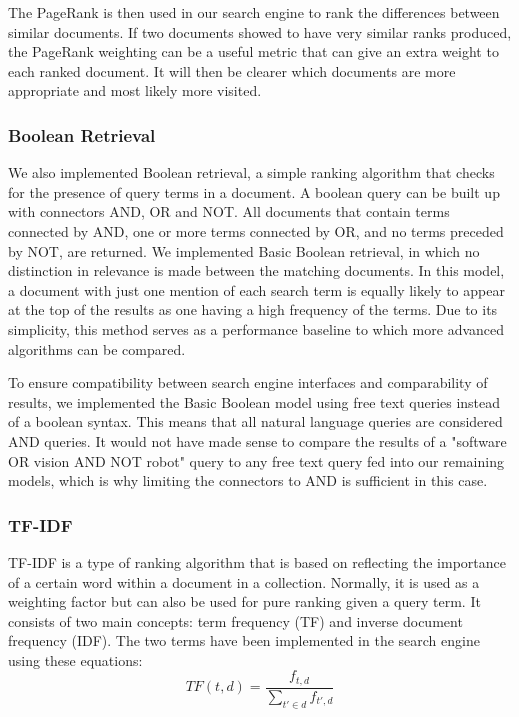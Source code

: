 The PageRank is then used in our search engine to rank the differences between similar documents. If two documents showed to have very similar ranks produced, the PageRank weighting can be a useful metric that can give an extra weight to each ranked document. It will then be clearer which documents are more appropriate and most likely more visited. 



\subsubsection{Boolean Retrieval} %
\label{ssub:boolean_retrieval}

We also implemented Boolean retrieval, a simple ranking algorithm that checks for the presence of query terms in a document. A boolean query can be built up with connectors AND, OR and NOT. All documents that contain terms connected by AND, one or more terms connected by OR, and no terms preceded by NOT, are returned. We implemented Basic Boolean retrieval, in which no distinction in relevance is made between the matching documents. In this model, a document with just one mention of each search term is equally likely to appear at the top of the results as one having a high frequency of the terms. Due to its simplicity, this method serves as a performance baseline to which more advanced algorithms can be compared.

To ensure compatibility between search engine interfaces and comparability of results, we implemented the Basic Boolean model using free text queries instead of a boolean syntax. This means that all natural language queries are considered AND queries. It would not have made sense to compare the results of a "software OR vision AND NOT robot" query to any free text query fed into our remaining models, which is why limiting the connectors to AND is sufficient in this case.

\subsubsection{TF-IDF} %
\label{sub:tf_idf}

TF-IDF is a type of ranking algorithm that is based on reflecting the importance of a certain word within a document in a collection. Normally, it is used as a weighting factor but can also be used for pure ranking given a query term. It consists of two main concepts:  term frequency (TF) and inverse document frequency (IDF). The two terms have been implemented in the search engine using these equations:
$$TF(t,d) = \frac{f_{t,d}}{\sum\limits_{t' \in d} f_{t',d}}$$

